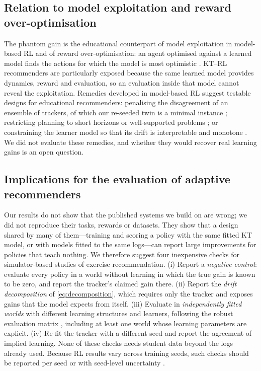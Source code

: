 \subsection{Relation to model exploitation and reward over-optimisation}

The phantom gain is the educational counterpart of model exploitation in model-based RL and of reward over-optimisation: an agent optimised against a learned model finds the actions for which the model is most optimistic \citep{kurutach2018metrpo,janner2019trust,gao2023scaling,skalse2022reward}. KT--RL recommenders are particularly exposed because the same learned model provides dynamics, reward and evaluation, so an evaluation inside that model cannot reveal the exploitation. Remedies developed in model-based RL suggest testable designs for educational recommenders: penalising the disagreement of an ensemble of trackers, of which our re-seeded twin is a minimal instance \citep{kurutach2018metrpo,yu2020mopo}; restricting planning to short horizons or well-supported problems \citep{janner2019trust}; or constraining the learner model so that its drift is interpretable and monotone \citep{zhang2023cmkt}. We did not evaluate these remedies, and whether they would recover real learning gains is an open question.

\subsection{Implications for the evaluation of adaptive recommenders}

Our results do not show that the published systems we build on are wrong; we did not reproduce their tasks, rewards or datasets. They show that a design shared by many of them---training and scoring a policy with the same fitted KT model, or with models fitted to the same logs---can report large improvements for policies that teach nothing. We therefore suggest four inexpensive checks for simulator-based studies of exercise recommendation. (i) Report a \emph{negative control}: evaluate every policy in a world without learning in which the true gain is known to be zero, and report the tracker's claimed gain there. (ii) Report the \emph{drift decomposition} of \cref{eq:decomposition}, which requires only the tracker and exposes gains that the model expects from itself. (iii) Evaluate in \emph{independently fitted worlds} with different learning structures and learners, following the robust evaluation matrix \citep{doroudi2017rem}, including at least one world whose learning parameters are explicit. (iv) Re-fit the tracker with a different seed and report the agreement of implied learning. None of these checks needs student data beyond the logs already used. Because RL results vary across training seeds, such checks should be reported per seed or with seed-level uncertainty \citep{henderson2018matters,agarwal2021precipice}.

